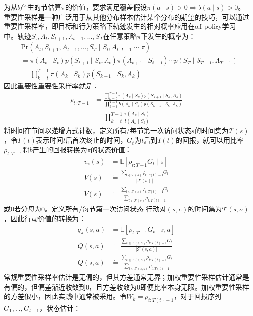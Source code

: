 \documentclass{ctexart}
\begin{document}
为从$b$产生的节估算$\pi$的价值，要求满足覆盖假设$\pi(a\mid s)>0\Rightarrow b(a\mid s)>0$。重要性采样是一种广泛用于从其他分布样本估计某个分布的期望的技巧，可以通过重要性采样率，即目标和行为策略下轨迹发生的相对概率应用在off-policy学习中。轨迹$S_t,A_t,S_{t+1},A_{t+1},\dots,S_T$在任意策略$\pi$下发生的概率为：
\begin{align*}
&\text{Pr}(A_t,S_{t+1}, A_{t+1},\dots,S_T\mid S_t,A_{t:T-1}\sim\pi)\\
&= \pi(A_t\mid S_t)p(S_{t+1}\mid S_t,A_t)\pi(A_{t+1}\mid S_{t+1})\cdots p(S_T\mid S_{T-1},A_{T-1})\\
&= \prod_{k=t}^{T-1}\pi(A_k\mid S_k)p(S_{k+1}\mid S_k,A_k)
\end{align*}
因此重要性重要性采样率就是：
\begin{align*}
\rho_{t:T-1} &\dot= \frac{\prod_{k=t}^{T-1}\pi(A_k\mid S_k)p(S_{k+1}\mid S_k,A_k)}{\prod_{k=t}^{T-1}b(A_k\mid S_k)p(S_{k+1}\mid S_k,A_k)}\\
&= \prod_{k=t}^{T-1} \frac{\pi(A_k\mid S_k)}{b(A_k\mid S_k)}
\end{align*}
将时间在节间以递增方式计数，定义所有/每节第一次访问状态$s$的时间集为$\mathcal T(s)$，令$T(t)$表示时间$t$后首次终止的时间，$G_t$为$t$后到$T(t)$的回报，就可以用比率$\rho_{t:T-1}$将$b$产生的回报转换为$\pi$的状态价值：
\begin{align*}
v_\pi(s) &= \mathbb E[\rho_{t:T-1}G_t \mid s]\\
V(s) &\dot= \frac{\sum_{t\in\mathcal T(s)}\rho_{t:T(t)-1}G_t}{\vert\mathcal T(s)\vert} \tag{ordinary}\\
V(s) &\dot= \frac{\sum_{t\in\mathcal T(s)}\rho_{t:T(t)-1}G_t}{\sum_{t\in\mathcal T(s)}\rho_{t:T(t)-1}} \tag{weighted}
\end{align*}
或0若分母为0。定义所有/每节第一次访问状态-行动对$(s,a)$的时间集为$\mathcal T(s,a)$，因此行动价值的转换为：
\begin{align*}
q_\pi(s,a) &= \mathbb E[\rho_{t:T-1}G_t \mid s,a]\\
Q(s,a) &\dot= \frac{\sum_{t\in\mathcal T(s,a)}\rho_{t:T(t)-1}G_t}{\vert\mathcal T(s,a)\vert} \tag{ordinary}\\
Q(s,a) &\dot= \frac{\sum_{t\in\mathcal T(s,a)}\rho_{t:T(t)-1}G_t}{\sum_{t\in\mathcal T(s,a)}\rho_{t:T(t)-1}} \tag{weighted}
\end{align*}
常规重要性采样率估计是无偏的，但其方差通常无界；加权重要性采样估计通常是有偏的，但偏差渐近收敛到0，且方差收敛为0即便比率本身无限。加权重要性采样的方差很小，因此实践中通常被采用。令$W_k=\rho_{t:T(t)-1}$，对于回报序列$G_1,\dots,G_{t-1}$，状态估计：
\end{document}
